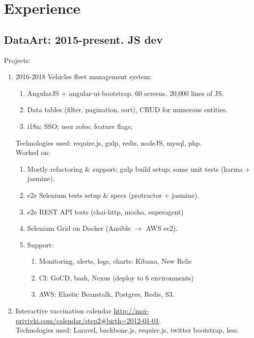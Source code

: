 \documentclass[a4paper, 14pt]{article}
\begin{document}
\section{Experience}
	\subsection{DataArt: 2015-present. JS dev}
    Projects:
    \begin{enumerate}
        \item 2016-2018 Vehicles fleet management system:
            \begin{enumerate}
              \item AngularJS + angular-ui-bootstrap. 60 screens. 20,000 lines of JS.
              \item Data tables (filter, pagination, sort), CRUD for numerous entities.
              \item i18n; SSO; user roles; feature flags;
            \end{enumerate}
            Technologies used: require.js, gulp, redis, nodeJS, mysql, php. \\
            Worked on: 
            \begin{enumerate}
              \item Mostly refactoring \& support; gulp build setup; some unit tests (karma + jasmine).
              \item e2e Selenium tests setup \& specs (protractor + jasmine).
              \item e2e REST API tests (chai-http, mocha, superagent)
              \item Selenium Grid on Docker (Ansible $\rightarrow$ AWS ec2).
              \item Support:
                \begin{enumerate}
                  \item Monitoring, alerts, logs, charts: Kibana, New Relic
                  \item CI: GoCD, bash, Nexus (deploy to 6 environments)
                  \item AWS: Elastic Beanstalk, Postgres, Redis, S3.
                \end{enumerate}
              \end{enumerate}
        \item Interactive vaccination calendar \url{http://moi-privivki.com/calendar/step2#birth=2012-01-01}. \\
            Technologies used: Laravel, backbone.js, require.js, twitter bootstrap, less. \\

\end{enumerate}
\end{document}
